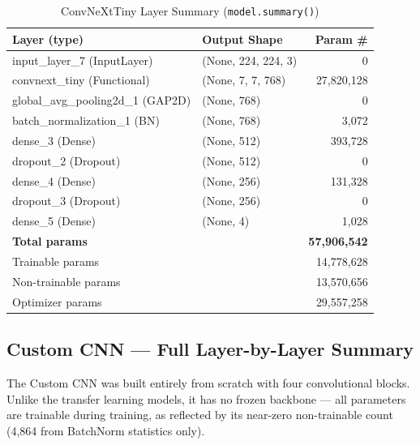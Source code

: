 \documentclass[12pt,a4paper]{article}
\begin{document}
\begin{table}[H]
\centering
\caption{ConvNeXtTiny Layer Summary (\texttt{model.summary()})}
\label{tab:summary_convnexttiny}
\begin{tabular}{l l r}
  \toprule
  \textbf{Layer (type)} & \textbf{Output Shape} & \textbf{Param \#} \\
  \midrule
  input\_layer\_7 (InputLayer)         & (None, 224, 224, 3)  &            0 \\
  convnext\_tiny (Functional)          & (None, 7, 7, 768)    &   27,820,128 \\
  global\_avg\_pooling2d\_1 (GAP2D)    & (None, 768)          &            0 \\
  batch\_normalization\_1 (BN)         & (None, 768)          &        3,072 \\
  dense\_3 (Dense)                     & (None, 512)          &      393,728 \\
  dropout\_2 (Dropout)                 & (None, 512)          &            0 \\
  dense\_4 (Dense)                     & (None, 256)          &      131,328 \\
  dropout\_3 (Dropout)                 & (None, 256)          &            0 \\
  dense\_5 (Dense)                     & (None, 4)            &        1,028 \\
  \midrule
  \multicolumn{2}{l}{\textbf{Total params}}    & \textbf{57,906,542} \\
  \multicolumn{2}{l}{Trainable params}         &      14,778,628 \\
  \multicolumn{2}{l}{Non-trainable params}     &      13,570,656 \\
  \multicolumn{2}{l}{Optimizer params}         &      29,557,258 \\
  \bottomrule
\end{tabular}
\end{table}

\subsection{Custom CNN --- Full Layer-by-Layer Summary}

The Custom CNN was built entirely from scratch with four convolutional blocks. Unlike the transfer learning models, it has no frozen backbone --- all parameters are trainable during training, as reflected by its near-zero non-trainable count (4,864 from BatchNorm statistics only).
\end{document}

